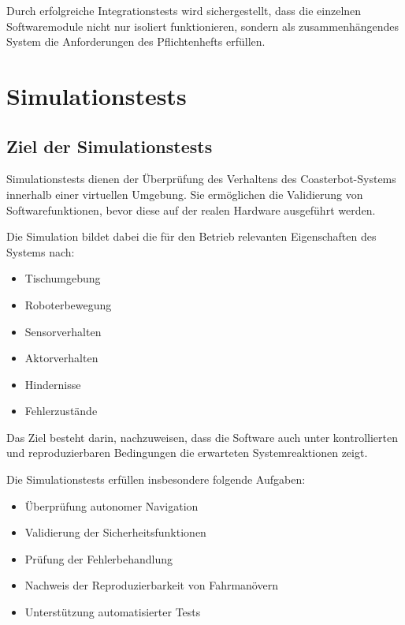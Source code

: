 Durch erfolgreiche Integrationstests wird sichergestellt, dass die
einzelnen Softwaremodule nicht nur isoliert funktionieren, sondern als
zusammenhängendes System die Anforderungen des Pflichtenhefts erfüllen.

\section{Simulationstests}\label{simulationstests-1}

\subsection{Ziel der Simulationstests}\label{ziel-der-simulationstests}

Simulationstests dienen der Überprüfung des Verhaltens des
Coasterbot-Systems innerhalb einer virtuellen Umgebung. Sie ermöglichen
die Validierung von Softwarefunktionen, bevor diese auf der realen
Hardware ausgeführt werden.

Die Simulation bildet dabei die für den Betrieb relevanten Eigenschaften
des Systems nach:

\begin{itemize}
\tightlist
\item
  Tischumgebung
\item
  Roboterbewegung
\item
  Sensorverhalten
\item
  Aktorverhalten
\item
  Hindernisse
\item
  Fehlerzustände
\end{itemize}

Das Ziel besteht darin, nachzuweisen, dass die Software auch unter
kontrollierten und reproduzierbaren Bedingungen die erwarteten
Systemreaktionen zeigt.

Die Simulationstests erfüllen insbesondere folgende Aufgaben:

\begin{itemize}
\tightlist
\item
  Überprüfung autonomer Navigation
\item
  Validierung der Sicherheitsfunktionen
\item
  Prüfung der Fehlerbehandlung
\item
  Nachweis der Reproduzierbarkeit von Fahrmanövern
\item
  Unterstützung automatisierter Tests
\end{itemize}

